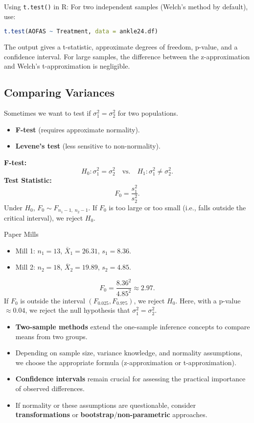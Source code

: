 \documentclass[10pt]{extarticle}
\begin{document}
\begin{conceptbox}{Using \texttt{t.test()} in R:}{}
    For two independent samples (Welch's method by default), use:
    \begin{lstlisting}[language=r]
    t.test(AOFAS ~ Treatment, data = ankle24.df)
    \end{lstlisting}
    The output gives a t-statistic, approximate degrees of freedom, p-value, and a confidence interval. For large samples, the difference between the z-approximation and Welch's t-approximation is negligible.
\end{conceptbox}


\subsection{Comparing Variances}
Sometimes we want to test if $\sigma_1^2 = \sigma_2^2$ for two populations.
\begin{itemize}
    \item \textbf{F-test} (requires approximate normality).
    \item \textbf{Levene's test} (less sensitive to non-normality).
\end{itemize}
\textbf{F-test:}
$$
H_0: \sigma_1^2 = \sigma_2^2 \quad \text{vs.} \quad H_1: \sigma_1^2 \neq \sigma_2^2.
$$
\textbf{Test Statistic:}
$$
F_0 = \frac{s_1^2}{s_2^2}.
$$
Under $H_0$, $F_0 \sim F_{n_1-1,\;n_2-1}$. If $F_0$ is too large or too small (i.e., falls outside the critical interval), we reject $H_0$.
\begin{examplebox}{Paper Mills}{}
    \begin{itemize}
        \item Mill 1: $n_1=13$, $\bar{X}_1=26.31$, $s_1=8.36$.
        \item Mill 2: $n_2=18$, $\bar{X}_2=19.89$, $s_2=4.85$.
    \end{itemize}
    $$
    F_0 = \frac{8.36^2}{4.85^2} \approx 2.97.
    $$
    If $F_0$ is outside the interval $(F_{0.025}, F_{0.975})$, we reject $H_0$. Here, with a p-value $\approx 0.04$, we reject the null hypothesis that $\sigma_1^2=\sigma_2^2$.
\end{examplebox}
\begin{takeaway-box}{}{}
\begin{itemize}
    \item \textbf{Two-sample methods} extend the one-sample inference concepts to compare means from two groups.
    \item Depending on sample size, variance knowledge, and normality assumptions, we choose the appropriate formula (z-approximation or t-approximation).
    \item \textbf{Confidence intervals} remain crucial for assessing the practical importance of observed differences.
    \item If normality or these assumptions are questionable, consider \textbf{transformations} or \textbf{bootstrap}/\textbf{non-parametric} approaches.
\end{itemize}
\end{takeaway-box}
\end{document}
